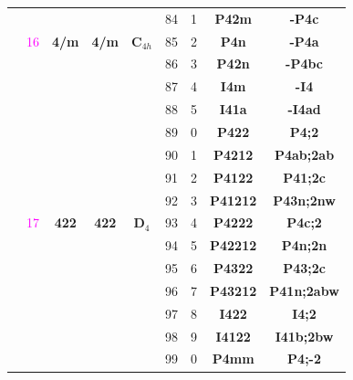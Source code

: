 \documentclass{article}      %
\begin{document}
\begin{small}
\begin{longtable}[c]{|c|c|c|c|c|c|c|c|c|}
          & & & & &\textrm{84} &\textrm{1} &\textbf{P42m}         &\textbf{-P4c}\\\cline{6-9}          
	  & \textrm{\textcolor{magenta}{16}} &\textbf{4/m} &\textbf{4/m} &$\mathbf{C}_{4h}$&\textrm{85} &\textrm{2} &\textbf{P4n} &\textbf{-P4a}\\\cline{6-9}
          & & & & &\textrm{86} &\textrm{3} &\textbf{P42n}         &\textbf{-P4bc}\\\cline{6-9}         
          & & & & &\textrm{87} &\textrm{4} &\textbf{I4m}         &\textbf{-I4}\\\cline{6-9}            
          & & & & &\textrm{88} &\textrm{5} &\textbf{I41a}         &\textbf{-I4ad}\\\cline{2-9}         
          & & & & &\textrm{89} &\textrm{0} &\textbf{P422}         &\textbf{P4;2}\\\cline{6-9}          
          & & & & &\textrm{90} &\textrm{1} &\textbf{P4212}       &\textbf{P4ab;2ab}\\\cline{6-9}       
          & & & & &\textrm{91} &\textrm{2} &\textbf{P4122}       &\textbf{P41;2c}\\\cline{6-9}         
          & & & & &\textrm{92} &\textrm{3} &\textbf{P41212}     &\textbf{P43n;2nw}\\\cline{6-9}        
	  & \textrm{\textcolor{magenta}{17}} &\textbf{422} &\textbf{422} &$\mathbf{D}_4$ &\textrm{93} &\textrm{4} &\textbf{P4222}  &\textbf{P4c;2}\\\cline{6-9} 
          & & & & &\textrm{94} &\textrm{5} &\textbf{P42212}     &\textbf{P4n;2n}\\\cline{6-9}          
          & & & & &\textrm{95} &\textrm{6} &\textbf{P4322}       &\textbf{P43;2c}\\\cline{6-9}         
          & & & & &\textrm{96} &\textrm{7} &\textbf{P43212}     &\textbf{P41n;2abw}\\\cline{6-9}       
          & & & & &\textrm{97} &\textrm{8} &\textbf{I422}         &\textbf{I4;2}\\\cline{6-9}          
          & & & & &\textrm{98} &\textrm{9} &\textbf{I4122}       &\textbf{I41b;2bw}\\\cline{2-9}       
          & & & & &\textrm{99} &\textrm{0} &\textbf{P4mm}         &\textbf{P4;-2}\\\cline{6-9}         

\end{longtable}
\end{small}
\end{document}
